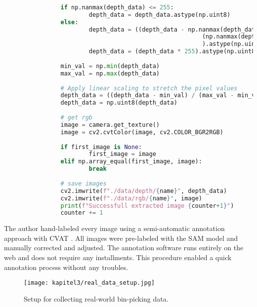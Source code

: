 \begin{lstlisting}[language=Python,caption=Capturing images from a file camera with depth image scaling, label=lst:file-camera]
				
				if np.nanmax(depth_data) <= 255:
						depth_data = depth_data.astype(np.uint8)
				else:
						depth_data = ((depth_data - np.nanmax(depth_data)) / 
														(np.nanmax(depth_data) - np.nanmin(depth_data))
														).astype(np.uint8)
						depth_data = (depth_data * 255).astype(np.uint8)
				
				min_val = np.min(depth_data)
				max_val = np.max(depth_data)
				
				# Apply linear scaling to stretch the pixel values
				depth_data = ((depth_data - min_val) / (max_val - min_val)) * 255
				depth_data = np.uint8(depth_data)
				
				# get rgb
				image = camera.get_texture()
				image = cv2.cvtColor(image, cv2.COLOR_BGR2RGB)
				
				if first_image is None:
						first_image = image
				elif np.array_equal(first_image, image):
						break
				
				# save images
				cv2.imwrite(f"./data/depth/{name}", depth_data)
				cv2.imwrite(f"./data/rgb/{name}", image)
				print(f"Successfull extracted image {counter+1}")
				counter += 1
		\end{lstlisting}
		
		The author hand-labeled every image using a semi-automatic annotation approach with CVAT \cite{cvat}. All images were pre-labeled with the SAM model \cite{Kirillov2023} and manually corrected and adjusted. The annotation software runs entirely on the web and does not require any installments. This procedure enabled a quick annotation process without any troubles.
	
		
		\begin{figure}[h]
			\centering
			\texttt{[image: kapitel3/real\_data\_setup.jpg]}
			\caption[Setup for collecting real-world bin-picking data.]{Setup for collecting real-world bin-picking data.}
			\label{img:real-data-setup}
		\end{figure}





